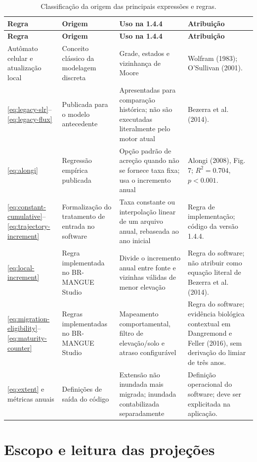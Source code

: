 \documentclass[11pt,a4paper]{article}
\begin{document}
\begin{longtable}{P{3.4cm}P{3.6cm}P{3.8cm}P{3.6cm}}
\caption{Classificação da origem das principais expressões e regras.}\\
\toprule
\textbf{Regra} & \textbf{Origem} & \textbf{Uso na 1.4.4} & \textbf{Atribuição}\\
\midrule
\endfirsthead
\toprule
\textbf{Regra} & \textbf{Origem} & \textbf{Uso na 1.4.4} & \textbf{Atribuição}\\
\midrule
\endhead
Autômato celular e atualização local & Conceito clássico da modelagem discreta & Grade, estados e vizinhança de Moore & Wolfram (1983); O'Sullivan (2001).\\
\eqref{eq:legacy-slr}--\eqref{eq:legacy-flux} & Publicada para o modelo antecedente & Apresentadas para comparação histórica; não são executadas literalmente pelo motor atual & Bezerra et al. (2014).\\
\eqref{eq:alongi} & Regressão empírica publicada & Opção padrão de acreção quando não se fornece taxa fixa; usa o incremento anual & Alongi (2008), Fig. 7; $R^2=0.704$, $p<0.001$.\\
\eqref{eq:constant-cumulative}--\eqref{eq:trajectory-increment} & Formalização do tratamento de entrada no software & Taxa constante ou interpolação linear de um arquivo anual, rebaseada ao ano inicial & Regra de implementação; código da versão 1.4.4.\\
\eqref{eq:local-increment} & Regra implementada no BR-MANGUE Studio & Divide o incremento anual entre fonte e vizinhas válidas de menor elevação & Regra do software; não atribuir como equação literal de Bezerra et al. (2014).\\
\eqref{eq:migration-eligibility}--\eqref{eq:maturity-counter} & Regras implementadas no BR-MANGUE Studio & Mapeamento comportamental, filtro de elevação/solo e atraso configurável & Regra do software; evidência biológica contextual em Dangremond e Feller (2016), sem derivação do limiar de três anos.\\
\eqref{eq:extent} e métricas anuais & Definições de saída do código & Extensão não inundada mais migrada; inundada contabilizada separadamente & Definição operacional do software; deve ser explicitada na aplicação.\\
\bottomrule
\end{longtable}

\section{Escopo e leitura das projeções}
\end{document}
